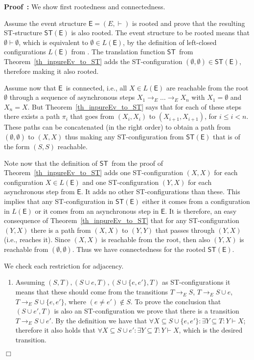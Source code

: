 \documentclass[submission,copyright,creativecommons]{eptcs}
\newenvironment{proof}[1][\!\!\,]{\vspace{1ex}\noindent\textbf{Proof #1: }}{\hfill$\Box$\vspace{2ex}}
\newcommand\E{\ensuremath{\mathsf{E}}}
\newcommand\stepTransEvGlabbeek{\ensuremath{\rightarrow_{E}}}
\newcommand\enableRelEv{\ensuremath{\vdash}}
\newcommand\cintost{\ensuremath{\mathsf{ST}}}
\newcommand\eintost{\ensuremath{\cintost}}
\begin{document}
\begin{proof}
We show first rootedness and connectedness.

Assume the event structure $\E=(E,\enableRelEv)$ is rooted and prove that the resulting ST-structure $\eintost(\E)$ is also rooted.
The event structure to be rooted means that $\emptyset\enableRelEv\emptyset$, which is equivalent to $\emptyset\in L(\E)$, by the definition of left-closed configurations $L(\E)$ from \cite[Def.1.4]{GlabbeekP09configStruct}.
The translation function \eintost\ from Theorem~\ref{th_inpureEv_to_ST} adds the ST-configuration $(\emptyset,\emptyset)\in\eintost(\E)$, therefore making it also rooted.

Assume now that \E\ is connected, i.e., all $X\in L(\E)$ are reachable from the root $\emptyset$ through a sequence of asynchronous steps $X_{1}\stepTransEvGlabbeek\dots\stepTransEvGlabbeek X_{n}$ with $X_{1}=\emptyset$ and $X_{n}=X$. But Theorem~\ref{th_inpureEv_to_ST} says that for each of these steps there exists a path $\pi_{i}$ that goes from $(X_{i},X_{i})$ to $(X_{i+1},X_{i+1})$, for $i\leq i<n$. These paths can be concatenated (in the right order) to obtain a path from $(\emptyset,\emptyset)$ to $(X,X)$ thus making any ST-configuration from $\eintost(\E)$ that is of the form $(S,S)$ reachable.

Note now that the definition of \eintost\ from the proof of Theorem~\ref{th_inpureEv_to_ST} adds one ST-configuration $(X,X)$ for each configuration $X\in L(\E)$ and one ST-configuration $(Y,X)$ for each asynchronous step from \E. It adds no other ST-configurations than these. This implies that any ST-configuration in $\eintost(\E)$ either it comes from a configuration in $L(\E)$ or it comes from an asynchronous step in \E.
It is therefore, an easy consequence of Theorem~\ref{th_inpureEv_to_ST} that for any ST-configuration $(Y,X)$ there is a path from $(X,X)$ to $(Y,Y)$ that passes through $(Y,X)$ (i.e., reaches it). Since $(X,X)$ is reachable from the root, then also $(Y,X)$ is reachable from $(\emptyset,\emptyset)$. Thus we have connectedness for the rooted $\eintost(\E)$.



We check each restriction for adjacency. 
\begin{enumerate}
\item Assuming $(S,T),(S\cup e,T),(S\cup \{e,e'\},T)$ as ST-configurations it means that these should come from the transitions $T\stepTransEvGlabbeek S$, $T\stepTransEvGlabbeek S\cup e$, $T\stepTransEvGlabbeek S\cup \{e,e'\}$, where $(e\neq e')\not\in S$. To prove the conclusion that $(S\cup e',T)$ is also an ST-configuration we prove that there is a transition $T\stepTransEvGlabbeek S\cup e'$. By the definition we have that $\forall X\subseteq S\cup \{e,e'\}:\exists Y\subseteq T:Y\enableRelEv X$; therefore it also holds that $\forall X\subseteq S\cup e':\exists Y\subseteq T:Y\enableRelEv X$, which is the desired transition.


\end{enumerate}
\end{proof}
\end{document}
